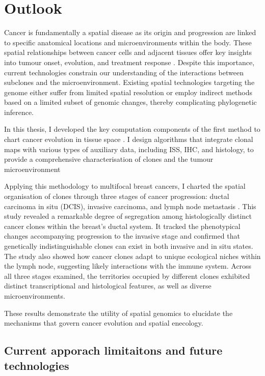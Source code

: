 \chapter{Outlook}
\label{sec:chapter-discussion}

Cancer is fundamentally a spatial disease as its origin and progression are linked to specific anatomical locations and microenvironments within the body. These spatial relationships between cancer cells and adjacent tissues offer key insights into tumour onset, evolution, and treatment response . Despite this importance, current technologies constrain our understanding of the interactions between subclones and the microenvironment. Existing spatial technologies targeting the genome either suffer from limited spatial resolution or employ indirect methods based on a limited subset of genomic changes, thereby complicating phylogenetic inference.

In this thesis, I developed the key computation components of the first method to chart cancer evolution in tissue space . 
I design algorithms that integrate clonal maps with various types of auxiliary data, including \ac{ISS}, \ac{IHC}, and histology, to provide a comprehensive characterisation of clones and the tumour microenvironment 

Applying this methodology to multifocal breast cancers, I charted the spatial organisation of clones through three stages of cancer progression: ductal carcinoma in situ (\ac{DCIS}), invasive carcinoma, and lymph node metastasis . This study revealed a remarkable degree of segregation among histologically distinct cancer clones within the breast's ductal system. It tracked the phenotypical changes accompanying progression to the invasive stage and confirmed that genetically indistinguishable clones can exist in both invasive and in situ states. The study also showed how cancer clones adapt to unique ecological niches within the lymph node, suggesting likely interactions with the immune system. Across all three stages examined, the territories occupied by different clones exhibited distinct transcriptional and histological features, as well as diverse microenvironments.

These results demonstrate the utility of spatial genomics to elucidate the mechanisms that govern cancer evolution and spatial enecology.

\section{Current apporach limitaitons and future technologies}

